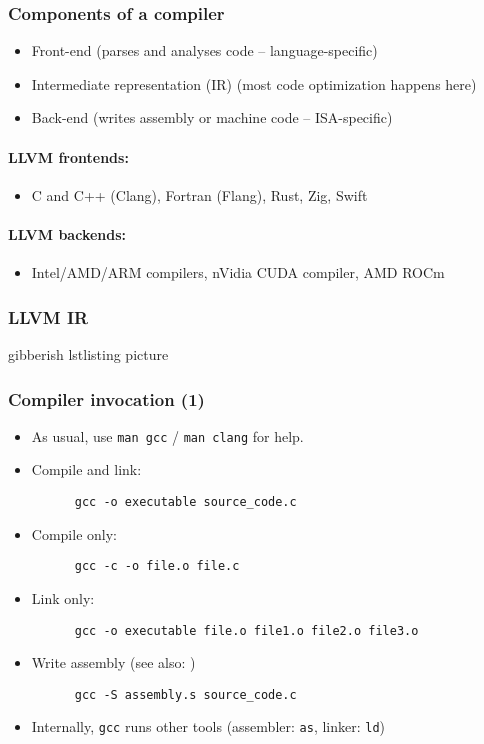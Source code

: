 \documentclass[12pt]{article}
\begin{document}
\subsubsection{Components of a compiler}
\begin{itemize}
    \item Front-end (parses and analyses code -- language-specific)
    \item Intermediate representation (IR) (most code optimization happens here)
    \item Back-end (writes assembly or machine code -- ISA-specific)
\end{itemize}

\paragraph{LLVM frontends:}
\begin{itemize}
    \item C and C++ (Clang), Fortran (Flang), Rust, Zig, Swift
\end{itemize}

\paragraph{LLVM backends:}
\begin{itemize}
    \item Intel/AMD/ARM compilers, nVidia CUDA compiler, AMD ROCm
\end{itemize}

\subsubsection{LLVM IR}
 gibberish lstlisting picture

\subsubsection{Compiler invocation (1)}

\begin{itemize}
  \item As usual, use \texttt{man gcc} / \texttt{man clang} for help.
  \item Compile and link:
    \begin{lstlisting}
      gcc -o executable source_code.c
    \end{lstlisting}
  \item Compile only:
    \begin{lstlisting}
      gcc -c -o file.o file.c
    \end{lstlisting}
  \item Link only:
    \begin{lstlisting}
      gcc -o executable file.o file1.o file2.o file3.o
    \end{lstlisting}
  \item Write assembly (see also: )
    \begin{lstlisting}
      gcc -S assembly.s source_code.c
    \end{lstlisting}
  \item Internally, \texttt{gcc} runs other tools (assembler: \texttt{as}, linker: \texttt{ld})
\end{itemize}
\end{document}
